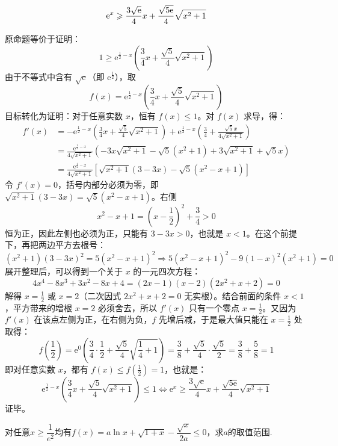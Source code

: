 \begin{example}
\[\mathrm{e}^x\geqslant\frac{3\sqrt{\mathrm{e}}}{4}x+\frac{\sqrt{5\mathrm{e}}}{4}\sqrt{x^2+1}\]
\end{example}
\begin{solution}
原命题等价于证明：
\[
1 \geqslant \mathrm{e}^{\frac{1}{2}-x} \left(\frac{3}{4}x + \frac{\sqrt{5}}{4}\sqrt{x^2+1}\right)
\]
由于不等式中含有 $\sqrt{\mathrm{e}}$（即 $\mathrm{e}^{\frac{1}{2}}$），取
\[
f(x) = \mathrm{e}^{\frac{1}{2}-x}\left(\frac{3}{4}x + \frac{\sqrt{5}}{4}\sqrt{x^{2}+1}\right)
\]
目标转化为证明：对于任意实数 $x$，恒有 $f(x) \leqslant 1$。对 $f(x)$ 求导，得：
\[
\begin{aligned}
f'(x) &= -\mathrm{e}^{\frac{1}{2}-x}\left(\frac{3}{4}x+\frac{\sqrt{5}}{4}\sqrt{x^2+1}\right) + \mathrm{e}^{\frac{1}{2}-x}\left(\frac{3}{4} + \frac{\sqrt{5}x}{4\sqrt{x^2+1}}\right) \\
&= \frac{\mathrm{e}^{\frac{1}{2}-x}}{4\sqrt{x^2+1}} \left( -3x\sqrt{x^2+1} - \sqrt{5}(x^2+1) + 3\sqrt{x^2+1} + \sqrt{5}x \right) \\
&= \frac{\mathrm{e}^{\frac{1}{2}-x}}{4\sqrt{x^2+1}} \left[ \sqrt{x^2+1}(3-3x) - \sqrt{5}(x^2-x+1) \right]
\end{aligned}
\]
令 $f'(x) = 0$，括号内部分必须为零，即 \(\sqrt{x^2+1}(3-3x) = \sqrt{5}(x^2-x+1)\)。右侧
\[
x^2-x+1=\left(x-\frac{1}{2}\right)^2 + \frac{3}{4}>0
\]
恒为正，因此左侧也必须为正，只能有 $3-3x>0$，也就是 $x<1$。在这个前提下，再把两边平方去根号：
\[
(x^2+1)(3-3x)^2 = 5(x^2-x+1)^2\Rightarrow 5(x^2-x+1)^2 - 9(1-x)^2(x^2+1) = 0
\]
展开整理后，可以得到一个关于 $x$ 的一元四次方程：
\[
4x^4 - 8x^3 + 3x^2 - 8x + 4 = (2x-1)(x-2)(2x^2+x+2) = 0
\]
解得 $x = \frac{1}{2}$ 或 $x = 2$（二次因式 $2x^2+x+2=0$ 无实根）。结合前面的条件 $x < 1$，平方带来的增根 $x=2$ 必须舍去，所以 $f'(x)$ 只有一个零点 $x=\frac{1}{2}$。又因为 $f'(x)$ 在该点左侧为正，在右侧为负，$f$ 先增后减，于是最大值只能在 $x=\frac{1}{2}$ 处取得：
\[
f\left(\frac{1}{2}\right) = \mathrm{e}^{0}\left(\frac{3}{4} \cdot \frac{1}{2} + \frac{\sqrt{5}}{4}\sqrt{\frac{1}{4}+1}\right) = \frac{3}{8} + \frac{\sqrt{5}}{4} \cdot \frac{\sqrt{5}}{2} = \frac{3}{8} + \frac{5}{8} = 1
\]
即对任意实数 $x$，都有 $f(x) \leqslant f\left(\frac{1}{2}\right) = 1$，也就是：
\[
\mathrm{e}^{\frac{1}{2}-x}\left(\frac{3}{4}x + \frac{\sqrt{5}}{4}\sqrt{x^{2}+1}\right) \leqslant 1
\Leftrightarrow\mathrm{e}^x \geqslant \frac{3\sqrt{\mathrm{e}}}{4}x + \frac{\sqrt{5\mathrm{e}}}{4}\sqrt{x^2+1}
\]
证毕。
\end{solution}
\begin{example}[（2019年浙江导数）]
    对任意$x\geq \dfrac{1}{e^2}$均有$f(x)=a\ln x+\sqrt{1+x}-\dfrac{\sqrt{x}}{2a}\leq 0$，求$a$的取值范围.
\end{example}
